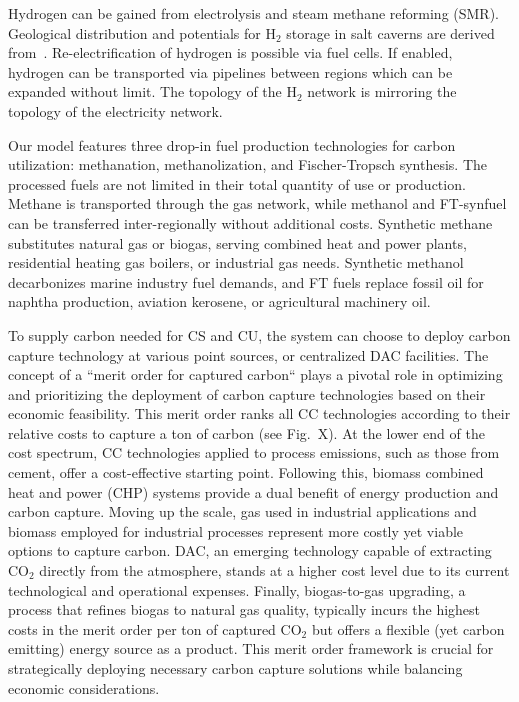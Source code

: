 \documentclass[twocolumn]{article}
\newcommand{\carbon}{CO$_2$}
\newcommand{\hydrogen}{H$_2$}
\begin{document}
Hydrogen can be gained from electrolysis and steam methane reforming (SMR). Geological distribution and potentials for \hydrogen{} storage in salt caverns are derived from~\cite{caglayanTechnicalPotentialSalt2020}. Re-electrification of hydrogen is possible via fuel cells. If enabled, hydrogen can be transported via pipelines between regions which can be expanded without limit. The topology of the \hydrogen{} network is mirroring the topology of the electricity network.

Our model features three drop-in fuel production technologies for carbon utilization: methanation, methanolization, and Fischer-Tropsch synthesis. The processed fuels are not limited in their total quantity of use or production. Methane is transported through the gas network, while methanol and FT-synfuel can be transferred inter-regionally without additional costs. Synthetic methane substitutes natural gas or biogas, serving combined heat and power plants, residential heating gas boilers, or industrial gas needs. Synthetic methanol decarbonizes marine industry fuel demands, and FT fuels replace fossil oil for naphtha production, aviation kerosene, or agricultural machinery oil.

To supply carbon needed for CS and CU, the system can choose to deploy carbon capture technology at various point sources, or centralized DAC facilities. The concept of a ``merit order for captured carbon`` plays a pivotal role in optimizing and prioritizing the deployment of carbon capture technologies based on their economic feasibility. This merit order ranks all CC technologies according to their relative costs to capture a ton of carbon (see Fig.~X). At the lower end of the cost spectrum, CC technologies applied to process emissions, such as those from cement, offer a cost-effective starting point. Following this, biomass combined heat and power (CHP) systems provide a dual benefit of energy production and carbon capture. Moving up the scale, gas used in industrial applications and biomass employed for industrial processes represent more costly yet viable options to capture carbon. DAC, an emerging technology capable of extracting \carbon{} directly from the atmosphere, stands at a higher cost level due to its current technological and operational expenses. Finally, biogas-to-gas upgrading, a process that refines biogas to natural gas quality, typically incurs the highest costs in the merit order per ton of captured \carbon{} but offers a flexible (yet carbon emitting) energy source as a product. This merit order framework is crucial for strategically deploying necessary carbon capture solutions while balancing economic considerations.
\end{document}
